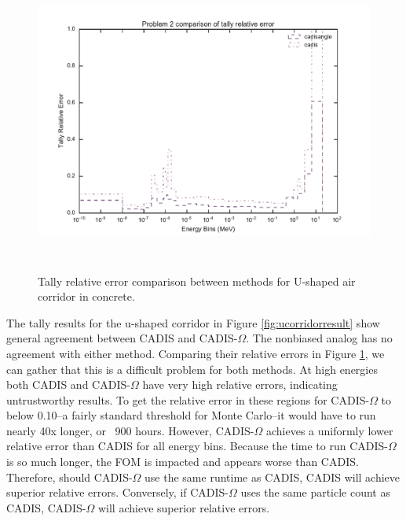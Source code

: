 \begin{figure}[h!]
  \centering
  \includegraphics[height=10cm]{./chapters/characterization_probs/figures/char/prob_2/problem_2_tally_error_compare.pdf}
  \caption[Tally relative error comparison between methods for U-shaped air
  corridor in concrete.]
  {Tally relative error comparison between methods for U-shaped air corridor in
  concrete.}
  \label{fig:ucorridorerror}
\end{figure}

The tally results for the u-shaped corridor in Figure \ref{fig:ucorridorresult}
show general agreement between CADIS and CADIS-$\Omega$. The nonbiased analog
has no agreement with either method. Comparing their relative errors in Figure
\ref{fig:ucorridorerror}, we can gather that this is a difficult problem for
both methods. At high energies both CADIS and CADIS-$\Omega$ have very high
relative errors, indicating untrustworthy results. To get the relative error in
these regions for CADIS-$\Omega$ to below 0.10--a fairly standard threshold for
Monte Carlo--it would have to run nearly 40x longer, or ~900 hours. However,
CADIS-$\Omega$ achieves a uniformly lower relative error than CADIS for all
energy bins. Because the time to run CADIS-$\Omega$ is so much longer, the FOM
is impacted and appears worse than CADIS. Therefore, should CADIS-$\Omega$ use
the same runtime as CADIS, CADIS will achieve superior relative errors.
Conversely, if CADIS-$\Omega$ uses the same particle count as CADIS,
CADIS-$\Omega$ will achieve superior relative errors.

